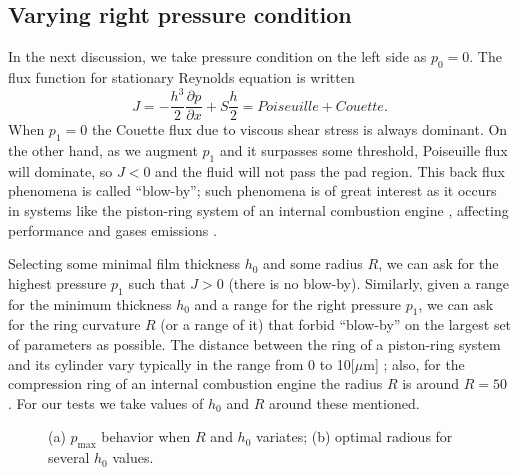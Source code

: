 \subsection{Varying right pressure condition}
In the next discussion, we take pressure condition on the left side as $p_0=0$. The flux function for stationary Reynolds equation is written
$$J=-\frac{h^3}{2}\frac{\partial p}{\partial x}+S\frac{h}{2}=Poiseuille+Couette.$$
When $p_1=0$ the Couette flux due to viscous shear stress is always dominant. On the other hand, as we augment $p_1$ and it surpasses some threshold, Poiseuille flux will dominate, so $J<0$ and the fluid will not pass the pad region. This back flux phenomena is called ``blow-by''; such phenomena is of great interest as it occurs in systems like the piston-ring system of an internal combustion engine \cite{heywood1988}, affecting performance and gases emissions \cite{namazian1982,aghdam2010}.

Selecting some minimal film thickness $h_0$ and some radius $R$, we can ask for the highest pressure $p_1$ such that $J>0$ (there is no blow-by). Similarly, given a range for the minimum thickness $h_0$ and a range for the right pressure $p_1$, we can ask for the ring curvature $R$ (or a range of it) that forbid ``blow-by'' on the largest set of parameters as possible. The distance between the ring of a piston-ring system and its cylinder vary typically in the range from 0 to 10[$\mu$m] \cite{irani1997,tamminen2006,dhar2009}; also, for the compression ring of an internal combustion engine the radius $R$ is around $R=50$ \cite{gadeshi2012}. For our tests we take values of $h_0$ and $R$ around these mentioned.\\
 \begin{figure}[h!]
 \def\svgwidth{1.1\textwidth}
  \centering \hspace*{-0.5cm}
{\scriptsize
}\caption[Dependence between $R$ and the maximum pressure difference for the pad disc]{(a) $p_\text{max}$ behavior when $R$ and $h_0$ variates; (b) optimal radious for several $h_0$ values.}\label{fig:pmax_vs_R}
\end{figure}

